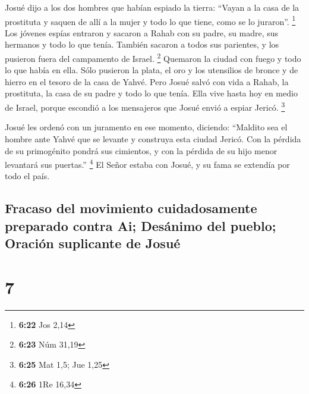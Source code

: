  Josué dijo a los dos hombres que habían espiado la
tierra: ``Vayan a la casa de la prostituta y saquen de allí a la mujer y
todo lo que tiene, como se lo juraron''. \footnote{\textbf{6:22} Jos
  2,14}  Los jóvenes espías entraron y sacaron a Rahab
con su padre, su madre, sus hermanos y todo lo que tenía. También
sacaron a todos sus parientes, y los pusieron fuera del campamento de
Israel. \footnote{\textbf{6:23} Núm 31,19}  Quemaron la
ciudad con fuego y todo lo que había en ella. Sólo pusieron la plata, el
oro y los utensilios de bronce y de hierro en el tesoro de la casa de
Yahvé.  Pero Josué salvó con vida a Rahab, la prostituta,
la casa de su padre y todo lo que tenía. Ella vive hasta hoy en medio de
Israel, porque escondió a los mensajeros que Josué envió a espiar
Jericó. \footnote{\textbf{6:25} Mat 1,5; Jue 1,25}

 Josué les ordenó con un juramento en ese momento,
diciendo: ``Maldito sea el hombre ante Yahvé que se levante y construya
esta ciudad Jericó. Con la pérdida de su primogénito pondrá sus
cimientos, y con la pérdida de su hijo menor levantará sus puertas.''
\footnote{\textbf{6:26} 1Re 16,34}  El Señor estaba con
Josué, y su fama se extendía por todo el país.

\hypertarget{fracaso-del-movimiento-cuidadosamente-preparado-contra-ai-desuxe1nimo-del-pueblo-oraciuxf3n-suplicante-de-josuuxe9}{%
\subsection{Fracaso del movimiento cuidadosamente preparado contra Ai;
Desánimo del pueblo; Oración suplicante de
Josué}\label{fracaso-del-movimiento-cuidadosamente-preparado-contra-ai-desuxe1nimo-del-pueblo-oraciuxf3n-suplicante-de-josuuxe9}}

\hypertarget{section-6}{%
\section{7}\label{section-6}}

